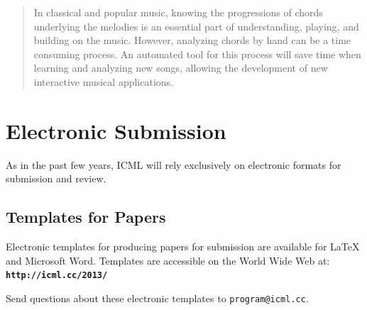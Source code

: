 \documentclass{article}
\begin{document}
 


\begin{abstract} 
In classical and popular music, knowing the progressions of chords underlying the melodies is an essential
part of understanding, playing, and building on the music. However, analyzing chords by hand can be a time consuming process. An automated
tool for this process will save time when learning and analyzing new songs, allowing the development of new interactive musical applications.
\end{abstract} 

\section{Electronic Submission}
\label{submission}

As in the past few years, ICML will rely exclusively on
electronic formats for submission and review. 


\subsection{Templates for Papers}

Electronic templates for producing papers for submission are available
for \LaTeX\/ and Microsoft Word. Templates are accessible on the World
Wide Web at:\\
\textbf{\texttt{http://icml.cc/2013/}}

\noindent
Send questions about these electronic templates to
\texttt{program@icml.cc}.
\end{document}
